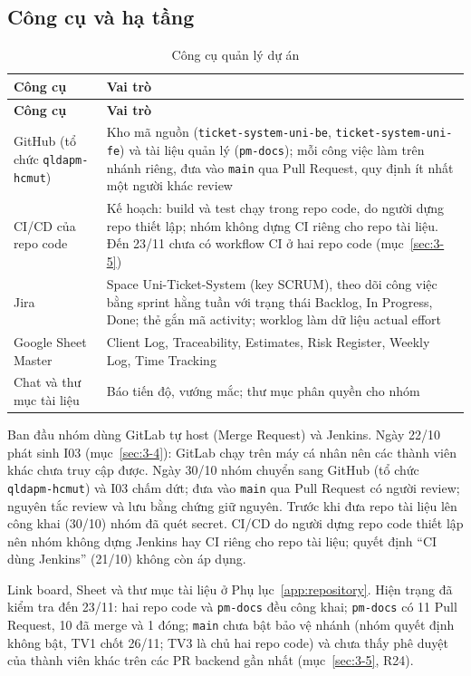 \subsection*{Công cụ và hạ tầng}
\begingroup\tblsetup\tblzebra
\begin{longtable}{L{2.6cm}L{11.4cm}}
\caption{Công cụ quản lý dự án}\label{tab:tools}\\
\toprule
{}\textbf{Công cụ} & \textbf{Vai trò} \\
\midrule
\endfirsthead
\toprule
{}\textbf{Công cụ} & \textbf{Vai trò} \\
\midrule
\endhead
\bottomrule
\endlastfoot
GitHub (tổ chức \texttt{qldapm-hcmut}) & Kho mã nguồn (\texttt{ticket-system-uni-be}, \texttt{ticket-system-uni-fe}) và tài liệu quản lý (\texttt{pm-docs}); mỗi công việc làm trên nhánh riêng, đưa vào \texttt{main} qua Pull Request, quy định ít nhất một người khác review \\
CI/CD của repo code & Kế hoạch: build và test chạy trong repo code, do người dựng repo thiết lập; nhóm không dựng CI riêng cho repo tài liệu. Đến 23/11 chưa có workflow CI ở hai repo code (mục~\ref{sec:3-5}) \\
Jira & Space Uni-Ticket-System (key SCRUM), theo dõi công việc bằng sprint hằng tuần với trạng thái Backlog, In Progress, Done; thẻ gắn mã activity; worklog làm dữ liệu actual effort \\
Google Sheet Master & Client Log, Traceability, Estimates, Risk Register, Weekly Log, Time Tracking \\
Chat và thư mục tài liệu & Báo tiến độ, vướng mắc; thư mục phân quyền cho nhóm \\
\end{longtable}
\endgroup
Ban đầu nhóm dùng GitLab tự host (Merge Request) và Jenkins. Ngày 22/10 phát sinh I03 (mục~\ref{sec:3-4}): GitLab chạy trên máy cá nhân nên các thành viên khác chưa truy cập được. Ngày 30/10 nhóm chuyển sang GitHub (tổ chức \texttt{qldapm-hcmut}) và I03 chấm dứt; đưa vào \texttt{main} qua Pull Request có người review; nguyên tắc review và lưu bằng chứng giữ nguyên. Trước khi đưa repo tài liệu lên công khai (30/10) nhóm đã quét secret. CI/CD do người dựng repo code thiết lập nên nhóm không dựng Jenkins hay CI riêng cho repo tài liệu; quyết định ``CI dùng Jenkins'' (21/10) không còn áp dụng.

Link board, Sheet và thư mục tài liệu ở Phụ lục~\ref{app:repository}. Hiện trạng đã kiểm tra đến 23/11: hai repo code và \texttt{pm-docs} đều công khai; \texttt{pm-docs} có 11 Pull Request, 10 đã merge và 1 đóng; \texttt{main} chưa bật bảo vệ nhánh (nhóm quyết định không bật, TV1 chốt 26/11; TV3 là chủ hai repo code) và chưa thấy phê duyệt của thành viên khác trên các PR backend gần nhất (mục~\ref{sec:3-5}, R24).

